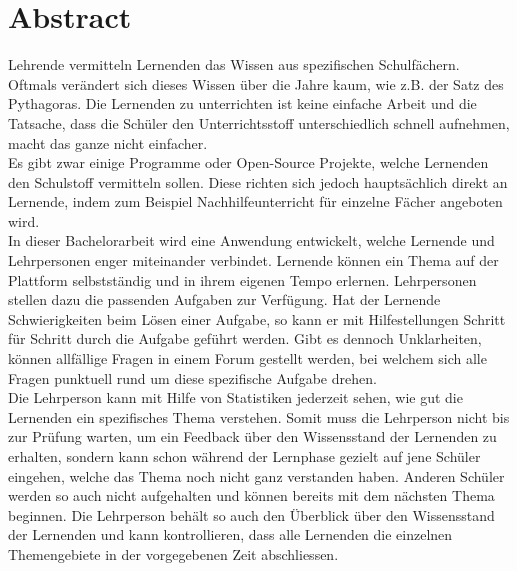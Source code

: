 \afterpage{\blankpage}
\section*{Abstract}

Lehrende vermitteln Lernenden das Wissen aus spezifischen Schulfächern. Oftmals verändert sich dieses Wissen über die Jahre kaum, wie z.B. der Satz des Pythagoras. Die Lernenden zu unterrichten ist keine einfache Arbeit und die Tatsache, dass die Schüler den Unterrichtsstoff unterschiedlich schnell aufnehmen, macht das ganze nicht einfacher. \\

Es gibt zwar einige Programme oder Open-Source Projekte, welche Lernenden den Schulstoff vermitteln sollen. Diese richten sich jedoch hauptsächlich direkt an Lernende, indem zum Beispiel Nachhilfeunterricht für einzelne Fächer angeboten wird.\\

In dieser Bachelorarbeit wird eine Anwendung entwickelt, welche Lernende und Lehrpersonen enger miteinander verbindet. Lernende können ein Thema auf der Plattform selbstständig und in ihrem eigenen Tempo erlernen. Lehrpersonen stellen dazu die passenden Aufgaben zur Verfügung. Hat der Lernende Schwierigkeiten beim Lösen einer Aufgabe, so kann er mit Hilfestellungen Schritt für Schritt durch die Aufgabe geführt werden. Gibt es dennoch Unklarheiten, können allfällige Fragen in einem Forum gestellt werden, bei welchem sich alle Fragen punktuell rund um diese spezifische Aufgabe drehen. \\

Die Lehrperson kann mit Hilfe von Statistiken jederzeit sehen, wie gut die Lernenden ein spezifisches Thema verstehen. Somit muss die Lehrperson nicht bis zur Prüfung warten, um ein Feedback über den Wissensstand der Lernenden zu erhalten, sondern kann schon während der Lernphase gezielt auf jene Schüler eingehen, welche das Thema noch nicht ganz verstanden haben. Anderen Schüler werden so auch nicht aufgehalten und können bereits mit dem nächsten Thema beginnen. Die Lehrperson behält so auch den Überblick über den Wissensstand der Lernenden und kann kontrollieren, dass alle Lernenden die einzelnen Themengebiete in der vorgegebenen Zeit abschliessen.


\newpage